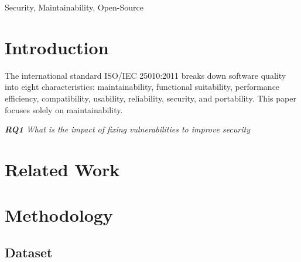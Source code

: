 \documentclass[10pt,conference]{IEEEtran}
\begin{document}
\begin{IEEEkeywords}
Security, Maintainability, Open-Source
\end{IEEEkeywords}

\section{Introduction}

The international standard ISO/IEC 25010:2011 breaks down software quality into eight characteristics: maintainability,
functional suitability, performance efficiency, compatibility, usability, reliability, security,
and portability. This paper focuses solely on maintainability.

\begin{framed}
\textit{\textbf{RQ1} What is the impact of fixing vulnerabilities to improve security }
\end{framed}

\section{Related Work}



\section{Methodology}



\subsection{Dataset}
\end{document}
